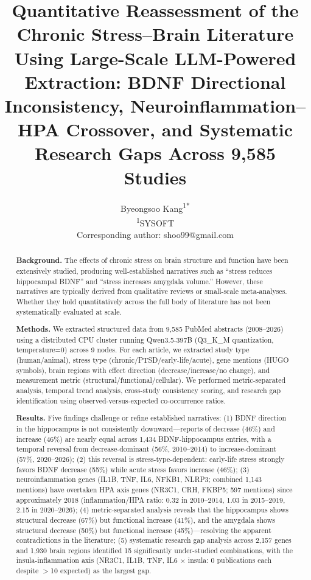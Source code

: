 \documentclass[12pt,a4paper]{article}
\title{Quantitative Reassessment of the Chronic Stress--Brain Literature Using Large-Scale LLM-Powered Extraction: BDNF Directional Inconsistency, Neuroinflammation--HPA Crossover, and Systematic Research Gaps Across 9,585 Studies}
\author{
Byeongsoo Kang\textsuperscript{1*}\\
\small\textsuperscript{1}SYSOFT\\
\small *Corresponding author: shoo99@gmail.com
}
\date{}
\begin{document}
\maketitle

\begin{abstract}
\textbf{Background.} The effects of chronic stress on brain structure and function have been extensively studied, producing well-established narratives such as ``stress reduces hippocampal BDNF'' and ``stress increases amygdala volume.'' However, these narratives are typically derived from qualitative reviews or small-scale meta-analyses. Whether they hold quantitatively across the full body of literature has not been systematically evaluated at scale.

\textbf{Methods.} We extracted structured data from 9,585 PubMed abstracts (2008--2026) using a distributed CPU cluster running Qwen3.5-397B (Q3\_K\_M quantization, temperature=0) across 9 nodes. For each article, we extracted study type (human/animal), stress type (chronic/PTSD/early-life/acute), gene mentions (HUGO symbols), brain regions with effect direction (decrease/increase/no change), and measurement metric (structural/functional/cellular). We performed metric-separated analysis, temporal trend analysis, cross-study consistency scoring, and research gap identification using observed-versus-expected co-occurrence ratios.

\textbf{Results.} Five findings challenge or refine established narratives: (1) BDNF direction in the hippocampus is not consistently downward---reports of decrease (46\%) and increase (46\%) are nearly equal across 1,434 BDNF-hippocampus entries, with a temporal reversal from decrease-dominant (56\%, 2010--2014) to increase-dominant (57\%, 2020--2026); (2) this reversal is stress-type-dependent: early-life stress strongly favors BDNF decrease (55\%) while acute stress favors increase (46\%); (3) neuroinflammation genes (IL1B, TNF, IL6, NFKB1, NLRP3; combined 1,143 mentions) have overtaken HPA axis genes (NR3C1, CRH, FKBP5; 597 mentions) since approximately 2018 (inflammation/HPA ratio: 0.32 in 2010--2014, 1.03 in 2015--2019, 2.15 in 2020--2026); (4) metric-separated analysis reveals that the hippocampus shows structural decrease (67\%) but functional increase (41\%), and the amygdala shows structural decrease (50\%) but functional increase (45\%)---resolving the apparent contradictions in the literature; (5) systematic research gap analysis across 2,157 genes and 1,930 brain regions identified 15 significantly under-studied combinations, with the insula-inflammation axis (NR3C1, IL1B, TNF, IL6 $\times$ insula: 0 publications each despite $>$10 expected) as the largest gap.


\end{abstract}
\end{document}
